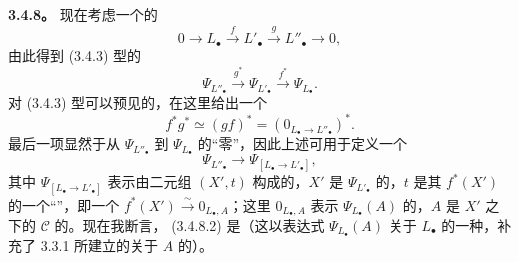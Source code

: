 \textbf{3.4.8。} 现在考虑一个的
\[
0\longrightarrow L_\bullet\xrightarrow{f}L'_\bullet\xrightarrow{g}L''_\bullet\longrightarrow0,\tag{3.4.8.1}
\]
由此得到 (3.4.3) 型的
\[
\Psi_{L''_\bullet}\xrightarrow{g^*}\Psi_{L'_\bullet}\xrightarrow{f^*}\Psi_{L_\bullet}.
\]
对 (3.4.3) 型可以预见的，在这里给出一个
\[
f^*g^*\simeq(gf)^*=(0_{L_\bullet\to L''_\bullet})^*.
\]
最后一项显然于从 $\Psi_{L''_\bullet}$ 到 $\Psi_{L_\bullet}$ 的“零”，因此上述可用于定义一个
\[
\Psi_{L''_\bullet}\longrightarrow\Psi_{[L_\bullet\longrightarrow L'_\bullet]},\tag{3.4.8.2}
\]
其中 $\Psi_{[L_\bullet\to L'_\bullet]}$ 表示由二元组 $(X',t)$ 构成的，$X'$ 是 $\Psi_{L'_\bullet}$ 的，$t$ 是其 $f^*(X')$ 的一个“”，即一个 $f^*(X')\xrightarrow{\sim}0_{L_\bullet,A}$；这里 $0_{L_\bullet,A}$ 表示 $\Psi_{L_\bullet}(A)$ 的，$A$ 是 $X'$ 之下的 $\mathcal C$ 的。现在我断言， (3.4.8.2) 是（这以表达式 $\Psi_{L_\bullet}(A)$ 关于 $L_\bullet$ 的一种，补充了 3.3.1 所建立的关于 $A$ 的）。

